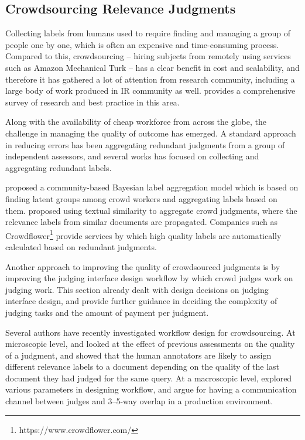 \subsection{Crowdsourcing Relevance Judgments}
\label{s-crowdsourcing}

Collecting labels from humans used to require finding and managing a group of people one by one, which is often an expensive and time-consuming process. Compared to this, crowdsourcing -- hiring subjects from remotely  using services such as Amazon Mechanical Turk -- has a clear benefit in cost and scalability, and  therefore it has gathered a lot of attention from research community, including a large body of work produced in IR community as well. \cite{Alonso2012} provides a comprehensive survey of research and best practice in this area. 

Along with the availability of cheap workforce from across the globe, the challenge in managing the quality of outcome has emerged. A standard approach in reducing errors has been aggregating redundant judgments from a group of independent assessors, and several works has focused on collecting and aggregating redundant labels. 

\cite{Venanzi:2014} proposed a community-based Bayesian label aggregation model which is based on finding latent groups among crowd workers and aggregating labels based on them. \cite{Davtyan2015} proposed using textual similarity to aggregate crowd judgments, where the relevance labels from similar documents are propagated. Companies such as Crowdflower\footnote{https://www.crowdflower.com/} provide services by which high quality labels are automatically calculated based on redundant judgments.

Another approach to improving the quality of crowdsourced judgments is by improving the judging interface design workflow by which crowd judges work on judging work. This section already dealt with design decisions on judging interface design, and \cite{Kazai2012} provide further guidance in deciding the complexity of judging tasks and the amount of payment per judgment.

Several authors have recently investigated workflow design for crowdsourcing. At microscopic level, \cite{Scholer:2013} and \cite{Shokouhi:2015} looked at the effect of previous assessments on the quality of a judgment, and showed that the human annotators are likely to assign different relevance labels to a document depending on the quality of the last document they had judged for the same query. At a macroscopic level, \cite{Megorskaya2015} explored various parameters in designing workflow, and argue for having a communication channel between judges and 3--5-way overlap in a production environment.

